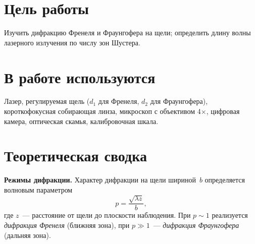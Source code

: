 \documentclass[twoside]{mfitjournal}
\begin{document}
\author{Иванов~Е.\,С.}
\email{}{}

\makeatletter
\renewcommand{\tit}{}
\renewcommand{\@oddhead}{}
\renewcommand{\@evenhead}{}
\makeatother

\pagestyle{fancy}
\fancyhf{}

\maketitle

\section*{Цель работы}

Изучить дифракцию Френеля и Фраунгофера на щели; определить длину волны
лазерного излучения по числу зон Шустера.

\section*{В работе используются}

Лазер, регулируемая щель ($d_1$ для Френеля, $d_2$ для Фраунгофера),
короткофокусная собирающая линза, микроскоп с объективом 4$\times$,
цифровая камера, оптическая скамья, калибровочная шкала.

\section*{Теоретическая сводка}

\textbf{Режимы дифракции.}
Характер дифракции на щели шириной~$b$ определяется волновым параметром
\begin{equation}\label{eq:wp}
    p = \frac{\sqrt{\lambda z}}{b},
\end{equation}
где $z$~--- расстояние от щели до плоскости наблюдения.
При $p \sim 1$ реализуется \emph{дифракция Френеля} (ближняя зона),
при $p \gg 1$~--- \emph{дифракция Фраунгофера} (дальняя зона).
\end{document}
